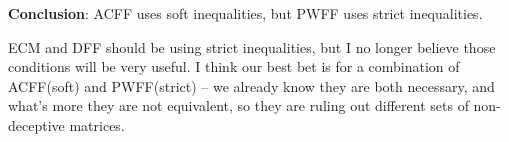 \textbf{Conclusion}: ACFF uses soft inequalities, but PWFF uses strict inequalities.

ECM and DFF should be using strict inequalities, but I no longer believe those conditions will be very useful. I think our best bet is for a combination of ACFF(soft) and PWFF(strict) -- we already know they are both necessary, and what's more they are not equivalent, so they are ruling out different sets of non-deceptive matrices.
